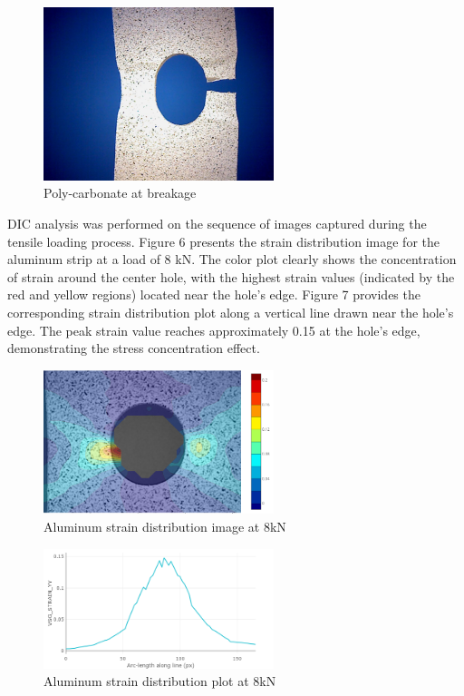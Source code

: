 \documentclass{article}
\begin{document}
\begin{figure}[H]
    \centering
    \includegraphics[width = 0.6\textwidth]{lab9images/polycarbonate_break.jpg}
    \caption{Poly-carbonate at breakage}
    \label{fig:PCfail}
\end{figure}

DIC analysis was performed on the sequence of images captured during the tensile loading process. Figure 6 presents the strain distribution image for the aluminum strip at a load of 8 kN. The color plot clearly shows the concentration of strain around the center hole, with the highest strain values (indicated by the red and yellow regions) located near the hole's edge. Figure 7 provides the corresponding strain distribution plot along a vertical line drawn near the hole's edge. The peak strain value reaches approximately 0.15 at the hole's edge, demonstrating the stress concentration effect.

\begin{figure}[H]
    \centering
    \includegraphics[width = 0.6\textwidth]{lab9images/meow color plot aluminum.PNG}
    \caption{Aluminum strain distribution image at 8kN}
    \label{fig:al8kNpic}
\end{figure}



\begin{figure}[H]
    \centering
    \includegraphics[width = 0.6\textwidth]{lab9images/8kNplot_Al_strainyy.png}
    \caption{Aluminum strain distribution plot at 8kN}
    \label{fig:al8kNplot}
\end{figure}
\end{document}
